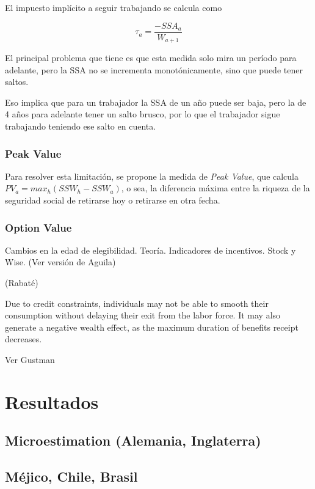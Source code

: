 \documentclass[]{article}
\begin{document}
El impuesto implícito a seguir trabajando se calcula como

\[ \tau_{a} = \frac{-SSA_{a}}{W_{a+1}}\]

El principal problema que tiene es que esta medida solo mira un período
para adelante, pero la SSA no se incrementa monotónicamente, sino que
puede tener saltos.

Eso implica que para un trabajador la SSA de un año puede ser baja, pero
la de 4 años para adelante tener un salto brusco, por lo que el
trabajador sigue trabajando teniendo ese salto en cuenta.

\hypertarget{peak-value}{%
\subsubsection{Peak Value}\label{peak-value}}

Para resolver esta limitación, se propone la medida de \emph{Peak
Value}, que calcula \(PV_{a} = max_{h}(SSW_{h}-SSW_{a})\), o sea, la
diferencia máxima entre la riqueza de la seguridad social de retirarse
hoy o retirarse en otra fecha.

\hypertarget{option-value}{%
\subsubsection{Option Value}\label{option-value}}

Cambios en la edad de elegibilidad. Teoría. Indicadores de incentivos.
Stock y Wise. (Ver versión de Aguila)

(Rabaté)

Due to credit constraints, individuals may not be able to smooth their
consumption without delaying their exit from the labor force. It may
also generate a negative wealth effect, as the maximum duration of
benefits receipt decreases.

Ver Gustman

\hypertarget{resultados}{%
\section{Resultados}\label{resultados}}

\hypertarget{microestimation-alemania-inglaterra}{%
\subsection{Microestimation (Alemania,
Inglaterra)}\label{microestimation-alemania-inglaterra}}

\hypertarget{muxe9jico-chile-brasil}{%
\subsection{Méjico, Chile, Brasil}\label{muxe9jico-chile-brasil}}
\end{document}
